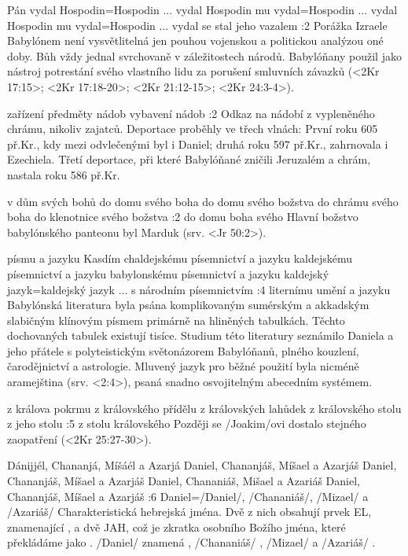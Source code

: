     {Pán vydal} %
    {Hospodin}={Hospodin ... vydal}  %
    {Hospodin mu vydal}={Hospodin ... vydal} %
    {Hospodin mu vydal}={Hospodin ... vydal}  %
    {se stal jeho vazalem}  %
:2 {} Porážka Izraele Babylónem není vysvětlitelná jen pouhou vojenskou a politickou analýzou oné doby. Bůh vždy jednal svrchovaně v záležitostech národů. Babylóňany použil jako nástroj potrestání svého vlastního lidu za porušení smluvních závazků (<2Kr 17:15>; <2Kr 17:18-20>; <2Kr 21:12-15>; <2Kr 24:3-4>).

    {zařízení} %
    {předměty}  %
    {nádob} %
    {vybavení}  %
    {nádob}  %
:2 {} Odkaz na nádobí z vypleněného chrámu, nikoliv zajatců. Deportace proběhly ve třech vlnách: První roku 605 př.Kr., kdy mezi odvlečenými byl i Daniel; druhá roku 597 př.Kr., zahrnovala i Ezechiela. Třetí deportace, při které Babylóňané zničili Jeruzalém a chrám, nastala roku 586 př.Kr.

    {v dům svých bohů} %
    {do domu svého boha}  %
    {do domu svého božstva} %
    {do chrámu svého boha}  %
    {do klenotnice svého božstva}  %
:2 {do domu boha svého}  Hlavní božstvo babylónského panteonu byl Marduk  (srv. <Jr 50:2>).

    {písmu a jazyku Kasdím} %
    {chaldejskému písemnictví a jazyku}  %
    {kaldejskému písemnictví a jazyku} %
    {babylonskému písemnictví a jazyku}  %
    {kaldejský jazyk}={kaldejský jazyk ... s národním písemnictvím}  %
:4 {liternímu umění a jazyku} Babylónská literatura byla psána komplikovaným sumérským a akkadským slabičným klínovým písmem primárně na hliněných tabulkách. Těchto dochovaných tabulek existují tisíce. Studium této literatury seznámilo Daniela a jeho přátele s polyteistickým světonázorem Babylóňanů, plného kouzlení, čarodějnictví a astrologie.  Mluvený jazyk pro běžné použití byla nicméně aramejština (srv. <2:4>), psaná snadno osvojitelným abecedním systémem.

    {z králova pokrmu} %
    {z královského přídělu}  %
    {z královských lahůdek} %
    {z královského stolu}  %
    {z jeho stolu} %
:5 {z stolu královského} Později se \x/Joakim/ovi dostalo stejného zaopatření (<2Kr 25:27-30>).

    {Dánijjél, Chananjá, Míšáél a Azarjá} %
    {Daniel, Chananjáš, Míšael a Azarjáš}  %
    {Daniel, Chananjáš, Míšael a Azarjáš} %
    {Daniel, Chananiáš, Mišael a Azariáš}  %
    {Daniel, Chananjáš, Míšael a Azarjáš}  %
:6 {Daniel}={\x/Daniel/, \x/Chananiáš/, \x/Mizael/ a \x/Azariáš/} Charakteristická  hebrejská jména. Dvě z nich obsahují prvek EL, znamenající , a dvě JAH, což je zkratka osobního Božího jména, které překládáme jako .  \x/Daniel/ znamená , \x/Chananiáš/ , \x/Mizael/  a \x/Azariáš/ .

